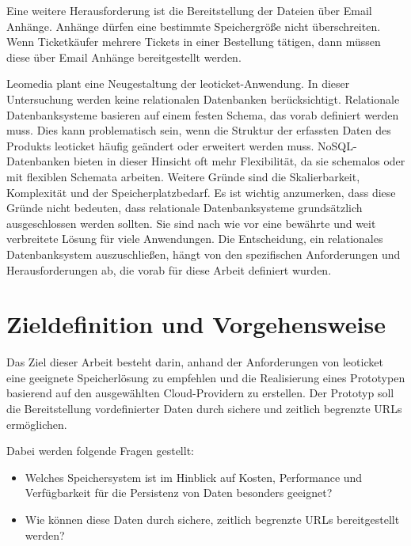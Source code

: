 Eine weitere Herausforderung ist die Bereitstellung der Dateien über Email Anhänge. Anhänge dürfen eine bestimmte Speichergröße nicht überschreiten. Wenn Ticketkäufer mehrere Tickets in einer Bestellung tätigen, dann müssen diese über Email Anhänge bereitgestellt werden.\\

\newpage

Leomedia plant eine Neugestaltung der leoticket-Anwendung. In dieser Untersuchung werden keine relationalen Datenbanken berücksichtigt. Relationale Datenbanksysteme basieren auf einem festen Schema, das vorab definiert werden muss. Dies kann problematisch sein, wenn die Struktur der erfassten Daten des Produkts leoticket häufig geändert oder erweitert werden muss. NoSQL-Datenbanken bieten in dieser Hinsicht oft mehr Flexibilität, da sie schemalos oder mit flexiblen Schemata arbeiten. Weitere Gründe sind die Skalierbarkeit, Komplexität und der Speicherplatzbedarf. Es ist wichtig anzumerken, dass diese Gründe nicht bedeuten, dass relationale Datenbanksysteme grundsätzlich ausgeschlossen werden sollten. Sie sind nach wie vor eine bewährte und weit verbreitete Lösung für viele Anwendungen. Die Entscheidung, ein relationales Datenbanksystem auszuschließen, hängt von den spezifischen Anforderungen und Herausforderungen ab, die vorab für diese Arbeit definiert wurden.

\newpage

\section{Zieldefinition und Vorgehensweise}

Das Ziel dieser Arbeit besteht darin, anhand der Anforderungen von leoticket eine geeignete Speicherlösung zu empfehlen und die Realisierung eines Prototypen basierend auf den ausgewählten Cloud-Providern zu erstellen. Der Prototyp soll die Bereitstellung vordefinierter Daten durch sichere und zeitlich begrenzte URLs ermöglichen. 

Dabei werden folgende Fragen gestellt:

\begin{itemize}
	\item Welches Speichersystem ist im Hinblick auf Kosten, Performance und Verfügbarkeit für die Persistenz von Daten besonders geeignet? 
	\item Wie können diese Daten durch sichere, zeitlich begrenzte URLs bereitgestellt werden?
\end{itemize}

